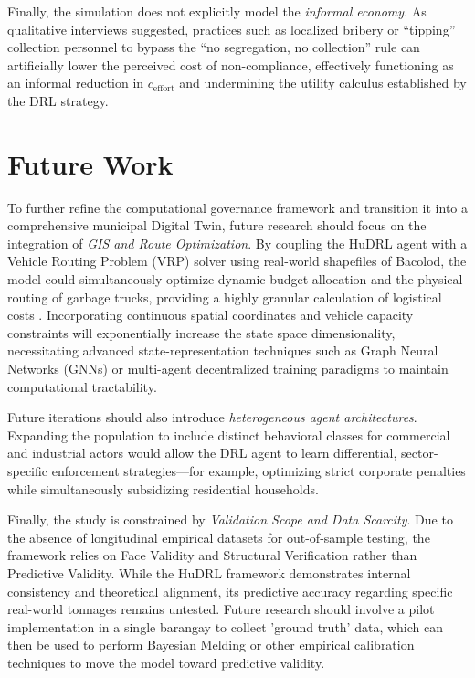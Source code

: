 Finally, the simulation does not explicitly model the \textit{informal economy}. As qualitative interviews suggested, practices such as localized bribery or ``tipping'' collection personnel to bypass the ``no segregation, no collection'' rule can artificially lower the perceived cost of non-compliance, effectively functioning as an informal reduction in $c_{\text{effort}}$ and undermining the utility calculus established by the DRL strategy.

\section{Future Work}

To further refine the computational governance framework and transition it into a comprehensive municipal Digital Twin, future research should focus on the integration of \textit{GIS and Route Optimization}. By coupling the HuDRL agent with a Vehicle Routing Problem (VRP) solver using real-world shapefiles of Bacolod, the model could simultaneously optimize dynamic budget allocation and the physical routing of garbage trucks, providing a highly granular calculation of logistical costs \citep{Torkayesh2021}. Incorporating continuous spatial coordinates and vehicle capacity constraints will exponentially increase the state space dimensionality, necessitating advanced state-representation techniques such as Graph Neural Networks (GNNs) or multi-agent decentralized training paradigms to maintain computational tractability.

Future iterations should also introduce \textit{heterogeneous agent architectures}. Expanding the population to include distinct behavioral classes for commercial and industrial actors would allow the DRL agent to learn differential, sector-specific enforcement strategies—for example, optimizing strict corporate penalties while simultaneously subsidizing residential households.

Finally, the study is constrained by \textit{Validation Scope and Data Scarcity}. Due to the absence of longitudinal empirical datasets for out-of-sample testing, the framework relies on Face Validity and Structural Verification rather than Predictive Validity. While the HuDRL framework demonstrates internal consistency and theoretical alignment, its predictive accuracy regarding specific real-world tonnages remains untested. Future research should involve a pilot implementation in a single barangay to collect 'ground truth' data, which can then be used to perform Bayesian Melding or other empirical calibration techniques to move the model toward predictive validity.
